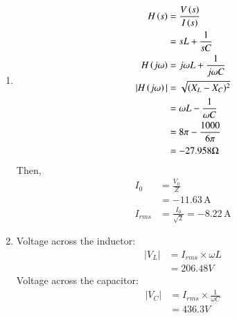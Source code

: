 \documentclass[a4,12pt,onecolumn]{IEEEtran}
\begin{document}
\begin{enumerate}
    \item 
    \begin{align}
    H\left(s\right) &=\frac{V\left(s\right)}{I\left(s\right)}\\
    &=sL+\frac{1}{sC}\\
    H\left(j\omega\right) &= j\omega L + \frac{1}{j\omega C}\\
    |H\left(j\omega\right)| &=\sqrt{(X_L - X_C)^2} \\
    &=\omega L - \frac{1}{\omega C} \\
    &= 8\pi - \frac{1000}{6\pi}\\
    &= -27.958\Omega   
    \end{align}
    Then,
    \begin{align}
        I_0 &= \frac{V_0}{Z} \\
        &= -11.63\, \text{A} \\
        I_{rms} &= \frac{I_0}{\sqrt{2}} = -8.22\, \text{A}
    \end{align}
    
    \item Voltage across the inductor:
    \begin{align}
        |V_L| &= I_{rms} \times \omega L \\
        &= 206.48V
    \end{align}
    Voltage across the capacitor:
    \begin{align}
       |V_C| &= I_{rms} \times \frac{1}{\omega C} \\
        &= 436.3V
    \end{align}


\end{enumerate}
\end{document}
